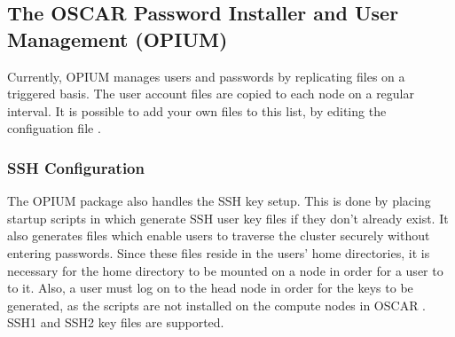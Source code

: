 %
%
%

\subsection{The OSCAR Password Installer and User Management (OPIUM)}
\label{app:opium-overview}

Currently, OPIUM manages users and passwords by replicating files on a
triggered basis.  The user account files are copied to each node on a
regular interval.  It is possible to add your own files to this list,
by editing the configuation file
.

\subsubsection{SSH Configuration}

The OPIUM package also handles the SSH key setup.  This is done by
placing startup scripts in  which generate SSH
user key files if they don't already exist.  It also generates
 files which enable users to traverse the
cluster securely without entering passwords.  Since these files reside
in the users' home directories, it is necessary for the home directory
to be mounted on a node in order for a user to  to it.  Also,
a user must log on to the head node in order for the keys to be
generated, as the  scripts are not installed on
the compute nodes in OSCAR \oscarversion.  SSH1 and SSH2 key files are
supported.

